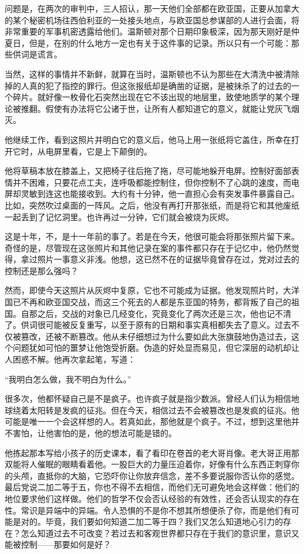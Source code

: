 问题是，在两次的审判中，三人招认，那一天他们全部都在欧亚国，正要从加拿大的某个秘密机场往西伯利亚的一处接头地点，与欧亚国总参谋部的人进行会面，将非常重要的军事机密透露给他们。温斯顿对那个日期印象极深，因为那天刚好是仲夏日，但是，在别的什么地方一定也有关于这件事的记录。所以只有一个可能：那些供词是谎言。

当然，这样的事情并不新鲜，就算在当时，温斯顿也不认为那些在大清洗中被清除掉的人真的犯了指控的罪行。但这张报纸却是确凿的证据，是被抹杀了的过去的一个碎片。就好像一枚骨化石突然出现在它不该出现的地层里，致使地质学的某个理论被推翻。假使有办法将它公诸于世，让所有人都知道它的意义，就能让党灰飞烟灭。

他继续工作，看到这照片并明白它的意义后，他马上用一张纸将它盖住，所幸在打开它时，从电屏里看，它是上下颠倒的。

他将草稿本放在膝盖上，又把椅子往后拖了拖，尽可能地躲开电屏。控制好面部表情并不困难，只要花点工夫，连呼吸都能控制住，但你控制不了心跳的速度，而电屏却灵敏到连这也能接收到。大约有十分钟，他一直担心会有突发事件暴露自己。比如，突然吹过桌面的一阵风。之后，他没有再打开那张纸，而是将它和其他废纸一起丢到了记忆洞里。也许再过一分钟，它们就会被烧为灰烬。

这是十年，不，是十一年前的事了。若是在今天，他很可能会将那张照片留下来。奇怪的是，尽管现在这张照片和其他记录在案的事件都只存在于记忆中，他仍然觉得，拿过照片一事意义非浅。他想，这已然不在的证据毕竟曾存在过，党对过去的控制还是那么强吗？

然而，即使今天这照片从灰烬中复原，它也不可能成为证据。他发现照片时，大洋国已不再和欧亚国交战，而这三个死去的人都是东亚国的特务，都背叛了自己的祖国。自那之后，交战的对象已几经变化，究竟变化了两次还是三次，他也记不清了。供词很可能被反复重写，以至于原有的日期和事实真相都失去了意义。过去不仅被篡改，还被不断篡改。他从未仔细想过为什么要如此大张旗鼓地伪造过去，这个问题犹如可怕的噩梦让他饱受折磨。伪造的好处显而易见，但它深层的动机却让人困惑不解。他再次拿起笔，写道：

``我明白怎么做，我不明白为什么。''

很多次，他都怀疑自己是不是疯子。也许疯子就是指少数派。曾经人们认为相信地球绕着太阳转是发疯的征兆。但在今天，相信过去不会被篡改也是发疯的征兆。他可能是唯一一个会这样想的人。若真如此，那他就是个疯子。不过，想到这里他并不害怕，让他害怕的是，他的想法可能是错的。

他拣起那本写给小孩子的历史课本，看了看印在卷首的老大哥肖像。老大哥正用那双能将人催眠的眼睛看着他。一股巨大的力量压迫着你，好像有什么东西正刺穿你的头颅，直抵你的大脑，它恐吓你让你放弃信念，差不多要说服你否认你的感觉。最后党说二加二等于五，你也不得不去相信，而他们无可避免地会这样做：他们的地位要求他们这样做。他们的哲学不仅会否认经验的有效性，还会否认现实的存在性。常识是异端中的异端。令人恐惧的不是你不想其所想便杀了你，而是他们有可能是对的。毕竟，我们要如何知道二加二等于四？我们又怎么知道地心引力的存在？怎么知道过去不可改变？若过去和客观世界都只存在于我们的意识里，意识又能被控制——那要如何是好？

